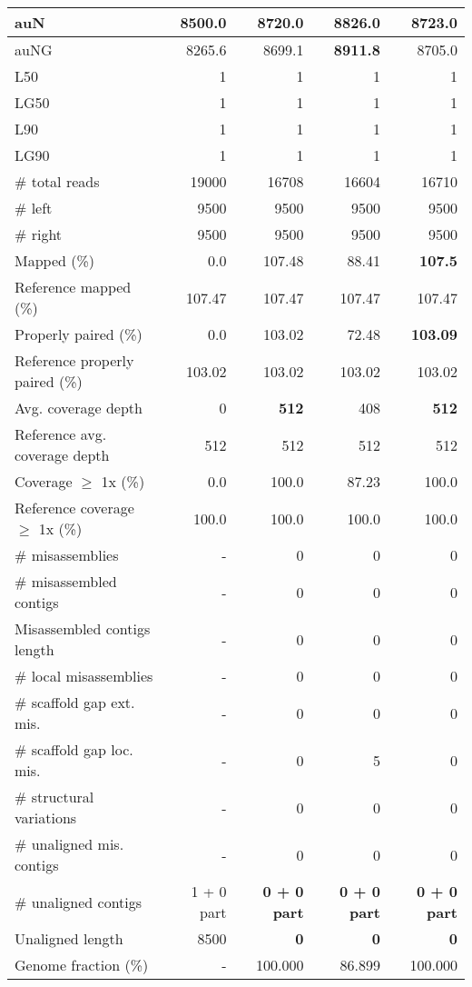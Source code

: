\documentclass[12pt,a4paper]{article}
\begin{document}
\begin{table}[ht]
\begin{center}
\begin{tabular}{|l*{4}{|r}|}
auN & 8500.0 & 8720.0 & {\bf 8826.0} & 8723.0 \\ \hline
auNG & 8265.6 & 8699.1 & {\bf 8911.8} & 8705.0 \\ \hline
L50 & 1 & 1 & 1 & 1 \\ \hline
LG50 & 1 & 1 & 1 & 1 \\ \hline
L90 & 1 & 1 & 1 & 1 \\ \hline
LG90 & 1 & 1 & 1 & 1 \\ \hline
\# total reads & 19000 & 16708 & 16604 & 16710 \\ \hline
\# left & 9500 & 9500 & 9500 & 9500 \\ \hline
\# right & 9500 & 9500 & 9500 & 9500 \\ \hline
Mapped (\%) & 0.0 & 107.48 & 88.41 & {\bf 107.5} \\ \hline
Reference mapped (\%) & 107.47 & 107.47 & 107.47 & 107.47 \\ \hline
Properly paired (\%) & 0.0 & 103.02 & 72.48 & {\bf 103.09} \\ \hline
Reference properly paired (\%) & 103.02 & 103.02 & 103.02 & 103.02 \\ \hline
Avg. coverage depth & 0 & {\bf 512} & 408 & {\bf 512} \\ \hline
Reference avg. coverage depth & 512 & 512 & 512 & 512 \\ \hline
Coverage $\geq$ 1x (\%) & 0.0 & 100.0 & 87.23 & 100.0 \\ \hline
Reference coverage $\geq$ 1x (\%) & 100.0 & 100.0 & 100.0 & 100.0 \\ \hline
\# misassemblies & - & 0 & 0 & 0 \\ \hline
\# misassembled contigs & - & 0 & 0 & 0 \\ \hline
Misassembled contigs length & - & 0 & 0 & 0 \\ \hline
\# local misassemblies & - & 0 & 0 & 0 \\ \hline
\# scaffold gap ext. mis. & - & 0 & 0 & 0 \\ \hline
\# scaffold gap loc. mis. & - & 0 & 5 & 0 \\ \hline
\# structural variations & - & 0 & 0 & 0 \\ \hline
\# unaligned mis. contigs & - & 0 & 0 & 0 \\ \hline
\# unaligned contigs & 1 + 0 part & {\bf 0 + 0 part} & {\bf 0 + 0 part} & {\bf 0 + 0 part} \\ \hline
Unaligned length & 8500 & {\bf 0} & {\bf 0} & {\bf 0} \\ \hline
Genome fraction (\%) & - & 100.000 & 86.899 & 100.000 \\ \hline

\end{tabular}
\end{center}
\end{table}
\end{document}
